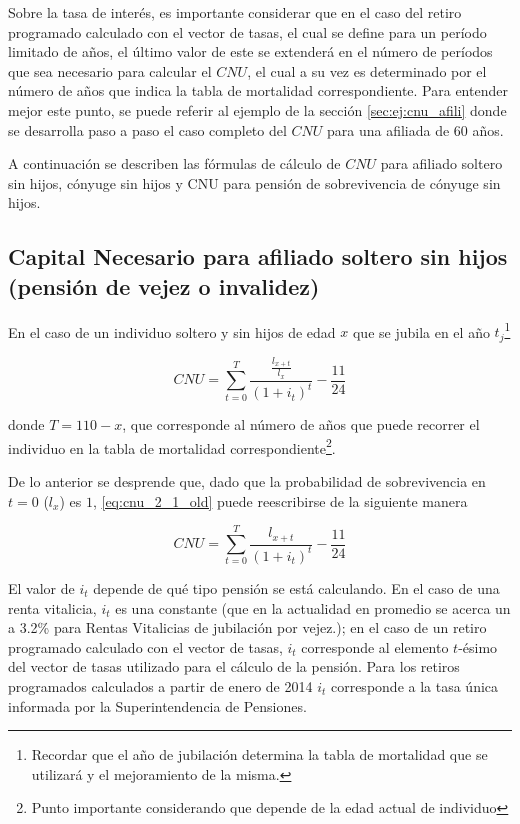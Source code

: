 \documentclass[letterpaper, 11pt]{article}
\begin{document}
Sobre la tasa de inter\'es, es importante considerar que en el caso del retiro
programado calculado con el vector de tasas, el cual se define para un per\'iodo limitado de
a\~nos, el \'ultimo valor de este se extender\'a en el n\'umero de per\'iodos que
sea necesario para calcular el $CNU$, el cual a su vez es determinado por el n\'umero
de a\~nos que indica la tabla de mortalidad correspondiente. Para entender mejor
este punto, se puede referir al ejemplo de la secci\'on \ref{sec:ej:cnu_afili} donde se
desarrolla paso a paso el caso completo del $CNU$ para una afiliada de 60 a\~nos.

A continuaci\'on se describen las f\'ormulas de c\'alculo de $CNU$ para afiliado
soltero sin hijos, c\'onyuge sin hijos y CNU para pensi\'on de sobrevivencia de
c\'onyuge sin hijos.

\subsection{Capital Necesario para afiliado soltero sin hijos (pensi\'on de vejez o invalidez)}
	
En el caso de un individuo soltero y sin hijos de edad $x$ que se jubila en el
a\~no $t_j$\footnote{Recordar que el a\~no de jubilaci\'on determina la tabla
de mortalidad que se utilizar\'a y el mejoramiento de la misma.}

\begin{equation}\label{eq:cnu_2_1_old}
CNU = \sum_{t=0}^{T}{\frac{\frac{l_{x+t}}{l_{x}}}{(1 + i_t)^t} - \frac{11}{24}}
\end{equation}

\noindent donde $T = 110 - x$, que corresponde al n\'umero de a\~nos que puede
recorrer el individuo en la tabla de mortalidad correspondiente\footnote{Punto
importante considerando que depende de la edad actual de individuo}.

De lo anterior se desprende que, dado que la probabilidad de sobrevivencia en
$t=0$ ($l_{x}$) es $1$, \ref{eq:cnu_2_1_old} puede reescribirse de la siguiente
manera

\begin{equation}\label{eq:cnu_2_1}
CNU = \sum_{t=0}^{T}{\frac{l_{x+t}}{(1 + i_t)^t} - \frac{11}{24}}
\end{equation}

El valor de $i_t$ depende de qu\'e tipo pensi\'on se est\'a calculando. En el caso
de una renta vitalicia, $i_t$ es una constante (que en la actualidad en promedio se acerca 
un a 3.2\% para Rentas Vitalicias de jubilaci\'on por vejez.); en el caso
de un retiro programado calculado con el vector de tasas, $i_t$ corresponde al
elemento $t$-\'esimo del vector de tasas utilizado para el c\'alculo de la pensi\'on.
Para los retiros programados calculados a partir de enero de 2014 $i_t$ corresponde
a la tasa \'unica informada por la Superintendencia de Pensiones.
\end{document}
